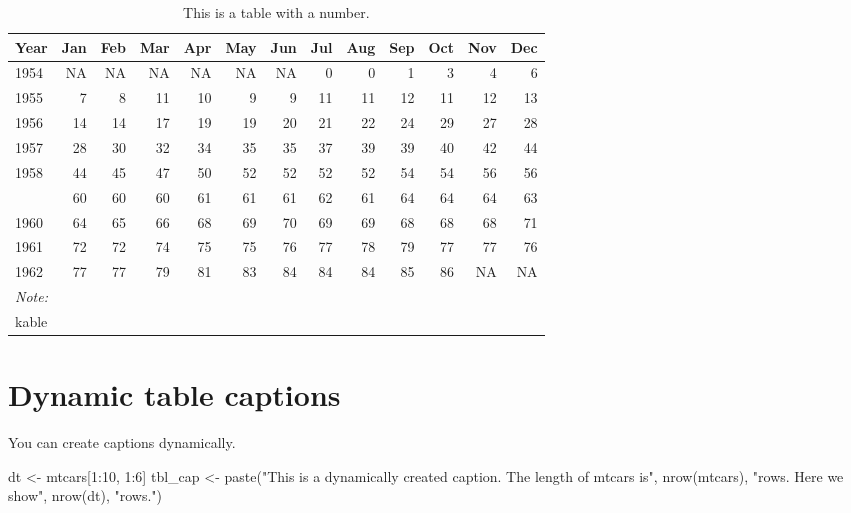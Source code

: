 \documentclass[
  letterpaper,
  oneside]{scrbook}
\newenvironment{Shaded}{\begin{snugshade}}{\end{snugshade}}
\newcommand{\DecValTok}[1]{\textcolor[rgb]{0.68,0.00,0.00}{#1}}
\newcommand{\FunctionTok}[1]{\textcolor[rgb]{0.28,0.35,0.67}{#1}}
\newcommand{\NormalTok}[1]{\textcolor[rgb]{0.00,0.23,0.31}{#1}}
\newcommand{\OtherTok}[1]{\textcolor[rgb]{0.00,0.23,0.31}{#1}}
\newcommand{\SpecialCharTok}[1]{\textcolor[rgb]{0.37,0.37,0.37}{#1}}
\newcommand{\StringTok}[1]{\textcolor[rgb]{0.13,0.47,0.30}{#1}}
\begin{document}
\hypertarget{tbl-tablabel}{}
\begin{table}
\caption{\label{tbl-tablabel}This is a table with a number. }\tabularnewline

\centering
\begin{tabular}[t]{lrrrrrrrrrrrr}
\toprule
Year & Jan & Feb & Mar & Apr & May & Jun & Jul & Aug & Sep & Oct & Nov & Dec\\
\midrule
1954 & NA & NA & NA & NA & NA & NA & 0 & 0 & 1 & 3 & 4 & 6\\
1955 & 7 & 8 & 11 & 10 & 9 & 9 & 11 & 11 & 12 & 11 & 12 & 13\\
1956 & 14 & 14 & 17 & 19 & 19 & 20 & 21 & 22 & 24 & 29 & 27 & 28\\
1957 & 28 & 30 & 32 & 34 & 35 & 35 & 37 & 39 & 39 & 40 & 42 & 44\\
1958 & 44 & 45 & 47 & 50 & 52 & 52 & 52 & 52 & 54 & 54 & 56 & 56\\
\addlinespace
1959 & 60 & 60 & 60 & 61 & 61 & 61 & 62 & 61 & 64 & 64 & 64 & 63\\
1960 & 64 & 65 & 66 & 68 & 69 & 70 & 69 & 69 & 68 & 68 & 68 & 71\\
1961 & 72 & 72 & 74 & 75 & 75 & 76 & 77 & 78 & 79 & 77 & 77 & 76\\
1962 & 77 & 77 & 79 & 81 & 83 & 84 & 84 & 84 & 85 & 86 & NA & NA\\
\bottomrule
\multicolumn{13}{l}{\rule{0pt}{1em}\textit{Note: }}\\
\multicolumn{13}{l}{\rule{0pt}{1em}kable}\\
\end{tabular}
\end{table}

\hypertarget{dynamic-table-captions}{%
\section{Dynamic table captions}\label{dynamic-table-captions}}

You can create captions dynamically.

\begin{Shaded}
\begin{Highlighting}[]
\NormalTok{dt }\OtherTok{\textless{}{-}}\NormalTok{ mtcars[}\DecValTok{1}\SpecialCharTok{:}\DecValTok{10}\NormalTok{, }\DecValTok{1}\SpecialCharTok{:}\DecValTok{6}\NormalTok{]}
\NormalTok{tbl\_cap }\OtherTok{\textless{}{-}} \FunctionTok{paste}\NormalTok{(}\StringTok{"This is a dynamically created caption. The length of mtcars is"}\NormalTok{, }\FunctionTok{nrow}\NormalTok{(mtcars), }\StringTok{"rows. Here we show"}\NormalTok{, }\FunctionTok{nrow}\NormalTok{(dt), }\StringTok{"rows."}\NormalTok{)}
\end{Highlighting}
\end{Shaded}
\end{document}
